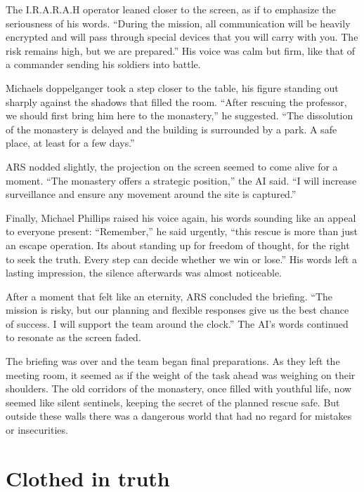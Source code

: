 \documentclass[
]{article}
\begin{document}
The I.R.A.R.A.H operator leaned closer to the screen, as if to emphasize
the seriousness of his words. ``During the mission, all communication
will be heavily encrypted and will pass through special devices that you
will carry with you. The risk remains high, but we are prepared.'' His
voice was calm but firm, like that of a commander sending his soldiers
into battle.

Michael\textquotesingle s doppelganger took a step closer to the table,
his figure standing out sharply against the shadows that filled the
room. ``After rescuing the professor, we should first bring him here to
the monastery,'' he suggested. ``The dissolution of the monastery is
delayed and the building is surrounded by a park. A safe place, at least
for a few days.''

ARS nodded slightly, the projection on the screen seemed to come alive
for a moment. ``The monastery offers a strategic position,'' the AI
\hspace{0pt}\hspace{0pt}said. ``I will increase surveillance and ensure
any movement around the site is captured.''

Finally, Michael Phillips raised his voice again, his words sounding
like an appeal to everyone present: ``Remember,'' he said urgently,
``this rescue is more than just an escape operation.
It\textquotesingle s about standing up for freedom of thought, for the
right to seek the truth. Every step can decide whether we win or lose.''
His words left a lasting impression, the silence afterwards was almost
noticeable.

After a moment that felt like an eternity, ARS concluded the briefing.
``The mission is risky, but our planning and flexible responses give us
the best chance of success. I will support the team around the clock.''
The AI's words continued to resonate as the screen faded.

The briefing was over and the team began final preparations. As they
left the meeting room, it seemed as if the weight of the task ahead was
weighing on their shoulders. The old corridors of the monastery, once
filled with youthful life, now seemed like silent sentinels, keeping the
secret of the planned rescue safe. But outside these walls there was a
dangerous world that had no regard for mistakes or insecurities.

\section{Clothed in truth}\label{clothed-in-truth}
\end{document}

